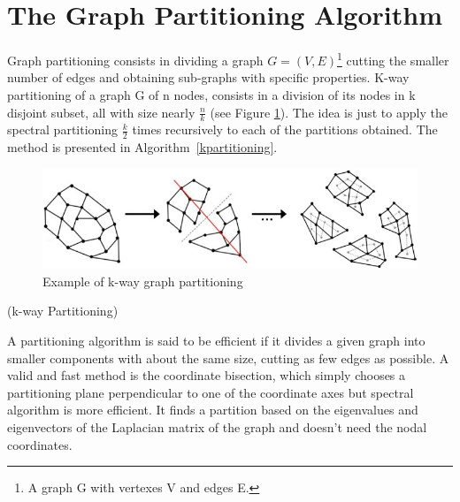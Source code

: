 \documentclass[]{usiinfbachelorproject}
\makeatletter
\def\BState{\State\hskip-\ALG@thistlm}
\makeatother
\begin{document}
\section{The Graph Partitioning Algorithm} \label{sec:graphpart} 
Graph partitioning consists in dividing a graph $G=(V,E)$\footnote{A graph G with vertexes V and edges E.}  cutting the smaller number of edges and obtaining sub-graphs with specific properties. K-way partitioning of a graph G of n nodes, consists in a division of its nodes in k disjoint subset, all with size nearly $\frac{n}{k}$ (see Figure \ref{fig:kpartitioning}). The idea is just to apply the spectral partitioning $\frac{k}{2}$ times recursively to each of the partitions obtained. The method is presented in Algorithm~\ref{kpartitioning}.

\begin{figure}[ht]
	\centering
	\includegraphics[height=3cm]{img/k_way_partitioning.jpg}
	\caption{Example of k-way graph partitioning}
	\label{fig:kpartitioning}
\end{figure}

\begin{algorithm}
\caption{ (k-way Partitioning)}\label{kpartitioning}
\end{algorithm}

A partitioning algorithm is said to be efficient if it divides a given graph into smaller components with about the same size, cutting as few edges as possible. 
A valid and fast method is the coordinate bisection, which simply chooses a partitioning plane perpendicular to one of the coordinate axes but spectral algorithm is more efficient. It finds a partition based on the eigenvalues and eigenvectors of the Laplacian matrix of the graph and doesn't need the nodal coordinates.
\end{document}
